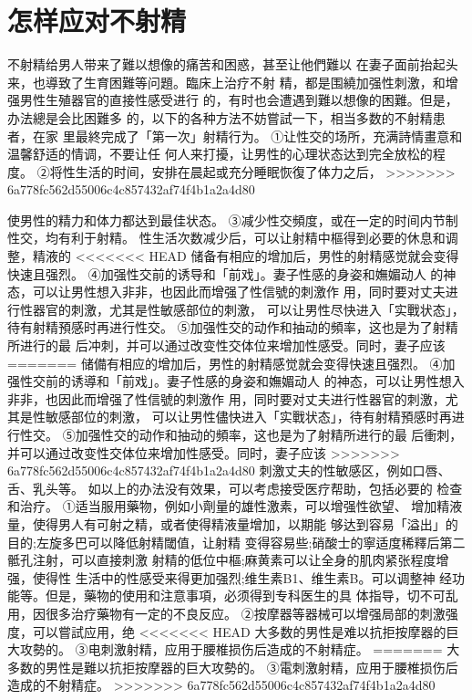 \documentclass[12pt,UTF8]{ctexbook}
\begin{document}
\section{怎样应对不射精}
不射精给男人带来了難以想像的痛苦和困惑，甚至让他們難以
在妻子面前抬起头来，也導致了生育困難等问題。臨床上治疗不射
精，都是围繞加强性刺激，和增强男性生殖器官的直接性感受进行
的，有时也会遭遇到難以想像的困難。但是，办法總是会比困難多
的，以下的各种方法不妨嘗試一下，相当多数的不射精患者，在家
里最終完成了「第一次」射精行为。
①让性交的场所，充满詩情畫意和温馨舒适的情调，不要让任
何人来打擾，让男性的心理状态达到完全放松的程度。
②将性生活的时间，安排在晨起或充分睡眠恢復了体力之后，
>>>>>>> 6a778fc562d55006c4c857432af74f4b1a2a4d80

使男性的精力和体力都达到最佳状态。
③减少性交頻度，或在一定的时间内节制性交，均有利于射精。
性生活次数减少后，可以让射精中樞得到必要的休息和调整，精液的
<<<<<<< HEAD
储备有相应的增加后，男性的射精感觉就会变得快速且强烈。
④加强性交前的诱导和「前戏」。妻子性感的身姿和嫵媚动人
的神态，可以让男性想入非非，也因此而增强了性信號的刺激作
用，同时要对丈夫进行性器官的刺激，尤其是性敏感部位的刺激，
可以让男性尽快进入「实戰状态」，待有射精預感时再进行性交。
⑤加强性交的动作和抽动的頻率，这也是为了射精所进行的最
后冲刺，并可以通过改变性交体位来增加性感受。同时，妻子应该
=======
储備有相应的增加后，男性的射精感觉就会变得快速且强烈。
④加强性交前的诱導和「前戏」。妻子性感的身姿和嫵媚动人
的神态，可以让男性想入非非，也因此而增强了性信號的刺激作
用，同时要对丈夫进行性器官的刺激，尤其是性敏感部位的刺激，
可以让男性儘快进入「实戰状态」，待有射精預感时再进行性交。
⑤加强性交的动作和抽动的頻率，这也是为了射精所进行的最
后衝刺，并可以通过改变性交体位来增加性感受。同时，妻子应该
>>>>>>> 6a778fc562d55006c4c857432af74f4b1a2a4d80
刺激丈夫的性敏感区，例如口唇、舌、乳头等。
如以上的办法没有效果，可以考虑接受医疗帮助，包括必要的
检查和治疗。
①适当服用藥物，例如小劑量的雄性激素，可以增强性欲望、
增加精液量，使得男人有可射之精，或者使得精液量增加，以期能
够达到容易「溢出」的目的;左旋多巴可以降低射精閾值，让射精
变得容易些;硝酸士的寧适度稀釋后第二骶孔注射，可以直接刺激
射精的低位中樞;麻黄素可以让全身的肌肉紧张程度增强，使得性
生活中的性感受来得更加强烈;维生素B1、维生素B。可以调整神
经功能等。但是，藥物的使用和注意事項，必须得到专科医生的具
体指导，切不可乱用，因很多治疗藥物有一定的不良反应。
②按摩器等器械可以增强局部的刺激强度，可以嘗試应用，绝
<<<<<<< HEAD
大多数的男性是难以抗拒按摩器的巨大攻勢的。
③电刺激射精，应用于腰椎损伤后造成的不射精症。
=======
大多数的男性是難以抗拒按摩器的巨大攻勢的。
③電刺激射精，应用于腰椎损伤后造成的不射精症。
>>>>>>> 6a778fc562d55006c4c857432af74f4b1a2a4d80
\end{document}
